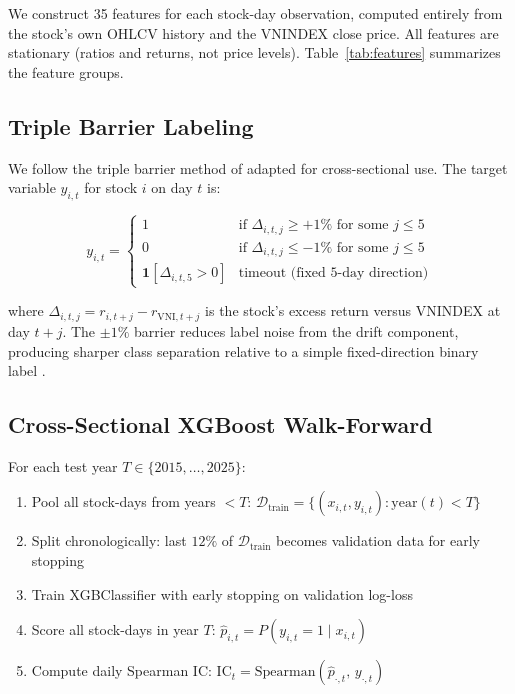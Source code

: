 \documentclass[12pt,a4paper]{article}
\begin{document}
We construct 35 features for each stock-day observation, computed entirely from the
stock's own OHLCV history and the VNINDEX close price. All features are stationary
(ratios and returns, not price levels). Table~\ref{tab:features} summarizes the
feature groups.



\subsection{Triple Barrier Labeling}
\label{sec:labeling}

We follow the triple barrier method of \citet{lopez2018advances} adapted for
cross-sectional use. The target variable $y_{i,t}$ for stock $i$ on day $t$ is:

\[
y_{i,t} =
\begin{cases}
  1 & \text{if } \Delta_{i,t,j} \geq +1\% \text{ for some } j \leq 5 \\
  0 & \text{if } \Delta_{i,t,j} \leq -1\% \text{ for some } j \leq 5 \\
  \mathbf{1}[\Delta_{i,t,5} > 0] & \text{timeout (fixed 5-day direction)}
\end{cases}
\]

where $\Delta_{i,t,j} = r_{i,t+j} - r_{\text{VNI},t+j}$ is the stock's excess
return versus VNINDEX at day $t+j$. The $\pm 1\%$ barrier reduces label noise from
the drift component, producing sharper class separation relative to a simple
fixed-direction binary label \citep{lopez2018advances}.

\subsection{Cross-Sectional XGBoost Walk-Forward}
\label{sec:model}

For each test year $T \in \{2015, \ldots, 2025\}$:

\begin{enumerate}
  \item Pool all stock-days from years $< T$:
        $\mathcal{D}_{\text{train}} = \{(x_{i,t}, y_{i,t}) : \text{year}(t) < T\}$
  \item Split chronologically: last $12\%$ of $\mathcal{D}_{\text{train}}$ becomes
        validation data for early stopping
  \item Train XGBClassifier with early stopping on validation log-loss
  \item Score all stock-days in year $T$:
        $\hat{p}_{i,t} = P(y_{i,t}=1 \mid x_{i,t})$
  \item Compute daily Spearman IC:
        $\text{IC}_t = \text{Spearman}(\hat{p}_{\cdot,t},\, y_{\cdot,t})$
\end{enumerate}
\end{document}
